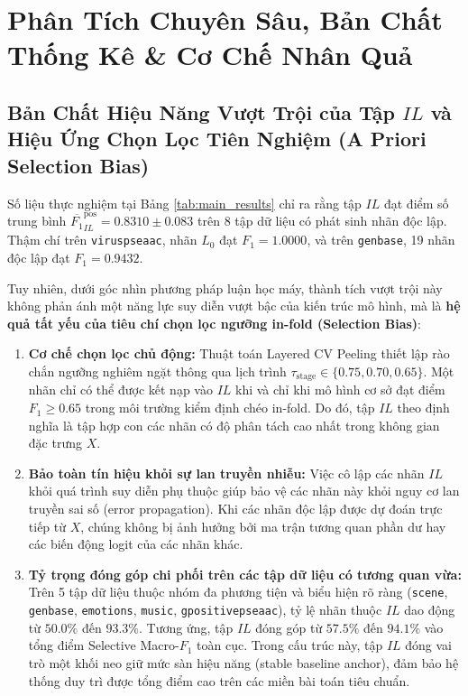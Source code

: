 \documentclass[10pt,a4paper]{article}
\begin{document}
\section{Phân Tích Chuyên Sâu, Bản Chất Thống Kê \& Cơ Chế Nhân Quả}

\subsection{Bản Chất Hiệu Năng Vượt Trội của Tập \texorpdfstring{$IL$}{IL} và Hiệu Ứng Chọn Lọc Tiên Nghiệm (A Priori Selection Bias)}
Số liệu thực nghiệm tại Bảng \ref{tab:main_results} chỉ ra rằng tập $IL$ đạt điểm số trung bình $\overline{F_1}^{\text{pos}}_{IL} = 0.8310 \pm 0.083$ trên 8 tập dữ liệu có phát sinh nhãn độc lập. Thậm chí trên \texttt{viruspseaac}, nhãn $L_0$ đạt $F_1 = 1.0000$, và trên \texttt{genbase}, 19 nhãn độc lập đạt $F_1 = 0.9432$. 

Tuy nhiên, dưới góc nhìn phương pháp luận học máy, thành tích vượt trội này không phản ánh một năng lực suy diễn vượt bậc của kiến trúc mô hình, mà là \textbf{hệ quả tất yếu của tiêu chí chọn lọc ngưỡng in-fold (Selection Bias)}:
\begin{enumerate}[leftmargin=*]
    \item \textbf{Cơ chế chọn lọc chủ động:} Thuật toán Layered CV Peeling thiết lập rào chắn ngưỡng nghiêm ngặt thông qua lịch trình $\tau_{\text{stage}} \in \{0.75, 0.70, 0.65\}$. Một nhãn chỉ có thể được kết nạp vào $IL$ khi và chỉ khi mô hình cơ sở đạt điểm $F_1 \ge 0.65$ trong môi trường kiểm định chéo in-fold. Do đó, tập $IL$ theo định nghĩa là tập hợp con các nhãn có độ phân tách cao nhất trong không gian đặc trưng $X$.
    \item \textbf{Bảo toàn tín hiệu khỏi sự lan truyền nhiễu:} Việc cô lập các nhãn $IL$ khỏi quá trình suy diễn phụ thuộc giúp bảo vệ các nhãn này khỏi nguy cơ lan truyền sai số (error propagation). Khi các nhãn độc lập được dự đoán trực tiếp từ $X$, chúng không bị ảnh hưởng bởi ma trận tương quan phần dư hay các biến động logit của các nhãn khác.
    \item \textbf{Tỷ trọng đóng góp chi phối trên các tập dữ liệu có tương quan vừa:} Trên 5 tập dữ liệu thuộc nhóm đa phương tiện và biểu hiện rõ ràng (\texttt{scene}, \texttt{genbase}, \texttt{emotions}, \texttt{music}, \texttt{gpositivepseaac}), tỷ lệ nhãn thuộc $IL$ dao động từ $50.0\%$ đến $93.3\%$. Tương ứng, tập $IL$ đóng góp từ $57.5\%$ đến $94.1\%$ vào tổng điểm Selective Macro-$F_1$ toàn cục. Trong cấu trúc này, tập $IL$ đóng vai trò một khối neo giữ mức sàn hiệu năng (stable baseline anchor), đảm bảo hệ thống duy trì được tổng điểm cao trên các miền bài toán tiêu chuẩn.
\end{enumerate}
\end{document}
